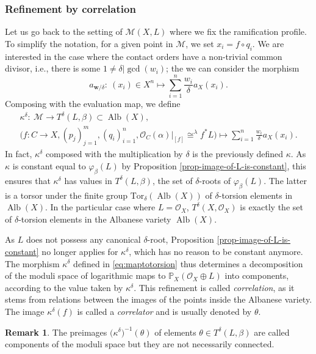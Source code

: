 \documentclass[11pt]{article}
\numberwithin{equation}{section}
\newcommand{\Tor}{\mathrm{Tor}}
\newcommand{\Alb}{\operatorname{Alb}}
\newcommand{\bfw}{ {\boldsymbol w} }
\newcommand{\M}{\mathcal{M}}
\renewcommand{\O}{\mathcal{O}}
\numberwithin{equation}{section}
\theoremstyle{definition}
\newtheorem{remarkk}[theo]{Remark}
\begin{document}
\subsubsection{Refinement by correlation}\label{sec:correlationrefinement}
Let us go back to the setting of $\M(X,L)$ where we fix the ramification profile. To simplify the notation, for a given point in $\M$, we set $x_i=f\circ q_i$. We are interested in the case where the contact orders have a non-trivial common divisor, i.e., there is some $1\neq\delta|\gcd(w_i)$; the we can consider the morphism
\[ a_{\bfw/\delta}\colon\ (x_i)\in X^n\longmapsto \sum_{i=1}^n \frac{w_i}{\delta}a_X(x_i). \]
Composing with the evaluation map, we define
\begin{gather}
 \kappa^\delta \colon\ \M \longrightarrow T^\delta(L,\beta)\subset\Alb(X), \nonumber\\
 \bigl(f\colon C\to X,(p_j)_{j=1}^m,(q_i)_{i=1}^n, \O_C(\alpha)\rvert_{[f]}\cong^{\lambda}f^*L\bigr) \longmapsto \sum_{i=1}^n\frac{w_i}{\delta} a_X (x_i)
.\label{eq:maptotorsion}
\end{gather}
In fact, $\kappa^\delta$ composed with the multiplication by $\delta$ is the previously defined $\kappa$. As $\kappa$ is constant equal to $\varphi_\beta(L)$ by Proposition \ref{prop-image-of-L-is-constant}, this ensures that $\kappa^\delta$ has values in $ T^\delta(L,\beta)$, the set of $\delta$-roots of $\varphi_\beta(L)$. The latter is a torsor under the finite group $\Tor_\delta(\Alb(X))$ of $\delta$-torsion elements in~$\Alb(X)$. In the particular case where $L=\mathcal O_X$, $T^\delta(X,\O_X)$ is exactly the set of $\delta$-torsion elements in the Albanese variety $\Alb(X)$.



As $L$ does not possess any canonical $\delta$-root, Proposition \ref{prop-image-of-L-is-constant} no longer applies for $\kappa^\delta$, which has no reason to be constant anymore. The morphism $\kappa^\delta$ defined in \eqref{eq:maptotorsion} thus determines a decomposition of the moduli space of logarithmic maps to $\mathbb P_X(\mathcal O_X\oplus L)$ into components, according to the value taken by $\kappa^\delta$. This refinement is called \textit{correlation}, as it stems from relations between the images of the points inside the Albanese variety. The image $\kappa^\delta(f)$ is called a \textit{correlator} and is usually denoted by $\theta$.

\begin{remarkk}
 The preimages $\bigl(\kappa^\delta\bigr)^{-1}(\theta)$ of elements $\theta\in T^\delta(L,\beta)$ are called components of the moduli space but they are not necessarily connected.
\end{remarkk}
\end{document}
